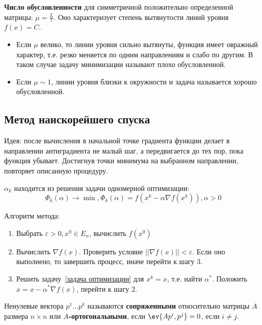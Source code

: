 \begin{definition}
    \textbf{Число обусловленности} для симметричной положительно определенной матрицы: \(\mu = \frac{L}{l}\). Оно характеризует степень вытянутости линий уровня \(f(x) = C\).
\end{definition}

\begin{itemize}
    \item Если \(\mu\) велико, то линии уровня сильно вытянуты, функция имеет овражный характер, т.е. резко меняется по одним направлениям и слабо по другим. В таком случае задачу минимизации называют плохо обусловленной.
    \item Если \(\mu \sim 1\), линии уровня близки к окружности и задача называется хорошо обусловленной.
\end{itemize}

\subsection{Метод наискорейшего спуска}

Идея: после вычисления в начальной точке градиента функции делает в направлении антиградиента не малый шаг, а передвигается до тех пор, пока функция убывает. Достигнув точки минимума на выбранном направлении, повторяет описанную процедуру.

\(\alpha_k\) находится из решения задачи одномерной оптимизации:
\begin{equation}
    \Phi_k(\alpha) \to \min , \Phi_k(\alpha) = f(x^k - \alpha \nabla f(x^k)), \alpha > 0
    \label{задача оптимизации}
\end{equation}

Алгоритм метода:
\begin{enumerate}
    \item Выбрать \(\varepsilon > 0, x^0 \in E_n\), вычислить \(f(x^0)\)
    \item Вычислить \(\nabla f(x)\). Проверить условие \(||\nabla f(x)|| < \varepsilon\). Если оно выполнено, то завершить процесс, иначе перейти к шагу 3.
    \item Решить задачу~\eqref{задача оптимизации} для \(x^k = x\), т.е. найти \(\alpha^*\). Положить \(x = x - \alpha^* \nabla f(x)\), перейти к шагу 2.
\end{enumerate}

\begin{definition}
    Ненулевые вектора \(p^1 \dots p^k\) называются \textbf{сопряженными} относительно матрицы \(A\) размера \(n \times n\) или \textbf{\(A\)-ортогональными}, если \(\ev{A p^i, p^j} = 0\), если \(i \neq j\).
\end{definition}

